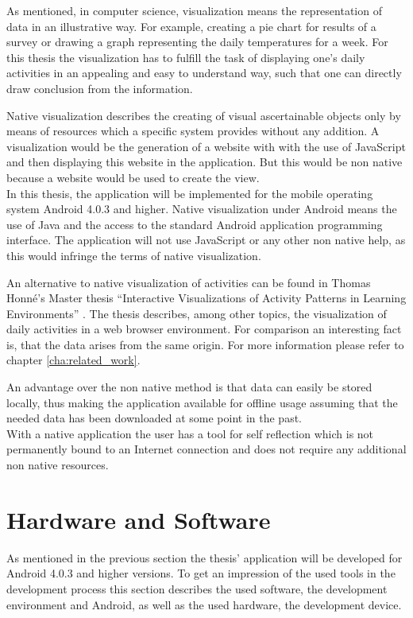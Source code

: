 As mentioned, in computer science, visualization means the representation of data in an illustrative way. For example, creating a pie chart for results of a survey or drawing a graph representing the daily temperatures for a week. For this thesis the visualization has to fulfill the task of displaying one's daily activities in an appealing and easy to understand way, such that one can directly draw conclusion from the information.

Native  visualization describes the creating of visual ascertainable objects only by means of resources which a specific system provides without any addition. A visualization would be the generation of a website with with the use of JavaScript and then displaying this website in the application. But this would be non native because a website would be used to create the view.\\
In this thesis, the application will be implemented for the mobile operating system Android 4.0.3 and higher. Native visualization under Android means the use of Java and the access to the standard Android application programming interface. The application will not use JavaScript or any other non native help, as this would infringe the terms of native visualization.

An  alternative to native visualization of activities can be found in Thomas Honné's Master thesis ``Interactive Visualizations of Activity Patterns in Learning Environments'' \cite{thomasthesis}. The thesis describes, among other topics, the visualization of daily activities in a web browser environment. For comparison an interesting fact is, that the data arises from the same origin. For more information please refer to chapter \ref{cha:related_work}.

An advantage over the non native method is that data can easily be stored locally, thus making the application available for offline usage assuming that the needed data has been downloaded at some point in the past.\\
With a native application the user has a tool for self reflection which is not permanently bound to an Internet connection and does not require any additional non native resources.
\section{Hardware and Software}
As mentioned in the previous section the thesis' application will be developed for Android 4.0.3 and higher versions. To get an impression of the used tools in the development process this section describes the used software, the development environment and Android, as well as the used hardware, the development device.

